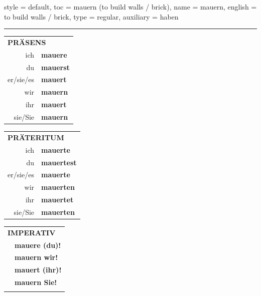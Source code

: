 \begin{verbentry}{
  style = {default},
  toc = {mauern (to build walls / brick)},
  name = {mauern},
  english = {to build walls / brick},
  type = {regular},
  auxiliary = {haben}
}
 
    
     \vspace{5pt}

    \hrule
    
    \vspace{5pt}

  \begin{tabular}{rl}
     \multicolumn{2}{l}{\textbf{PRÄSENS} }\\
    ich & \textbf{mauere}\\
    du & \textbf{mauerst}\\
    er/sie/es & \textbf{mauert}\\
    wir & \textbf{mauern}\\
    ihr & \textbf{mauert}\\
    sie/Sie & \textbf{mauern}\\
  \end{tabular}
  \hfill
  \begin{tabular}{rl}
    \multicolumn{2}{l}{\textbf{PRÄTERITUM} }\\
    ich & \textbf{mauerte}\\
    du & \textbf{mauertest}\\
    er/sie/es & \textbf{mauerte}\\
    wir & \textbf{mauerten}\\
    ihr & \textbf{mauertet}\\
    sie/Sie & \textbf{mauerten}\\
  \end{tabular}
  \hfill
  \begin{tabular}{rl}
     \multicolumn{2}{l}{\textbf{IMPERATIV} }\\
   & \textbf{mauere (du)!}\\
   & \textbf{mauern wir!}\\
   & \textbf{mauert (ihr)!}\\
   & \textbf{mauern Sie!}\\
   & \vspace{10pt}
  \end{tabular}

 \vspace{10pt}


\end{verbentry}

